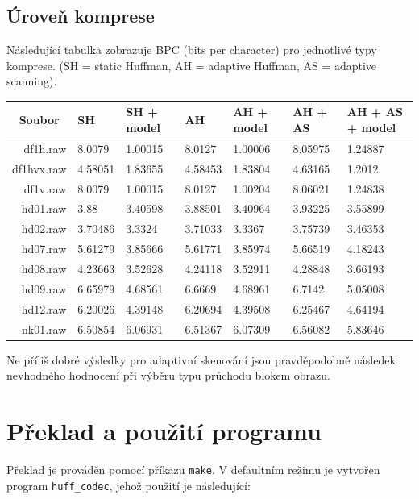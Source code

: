 \documentclass[12pt,a4paper,titlepage,final]{report}
\begin{document}
\subsection{Úroveň komprese}
Následující tabulka zobrazuje BPC (bits per character) pro jednotlivé typy komprese. (SH = static Huffman, AH = adaptive Huffman, AS = adaptive scanning).
\begin{table}[H]
\begin{tabular}{|r|l|l|l|l|l|l|}
\hline
\multicolumn{1}{|c|}{Soubor} & SH      & SH + model & AH      & AH + model & AH + AS & AH + AS + model \\ \hline
df1h.raw                     & 8.0079  & 1.00015    & 8.0127  & 1.00006    & 8.05975 & 1.24887         \\ \hline
df1hvx.raw                   & 4.58051 & 1.83655    & 4.58453 & 1.83804    & 4.63165 & 1.2012         \\ \hline
df1v.raw                     & 8.0079  & 1.00015    & 8.0127  & 1.00204    & 8.06021 & 1.24838         \\ \hline
hd01.raw                     & 3.88    & 3.40598    & 3.88501 & 3.40964    & 3.93225 & 3.55899          \\ \hline
hd02.raw                     & 3.70486 & 3.3324     & 3.71033 & 3.3367     & 3.75739 & 3.46353         \\ \hline
hd07.raw                     & 5.61279 & 3.85666    & 5.61771 & 3.85974    & 5.66519 & 4.18243         \\ \hline
hd08.raw                     & 4.23663 & 3.52628    & 4.24118 & 3.52911    & 4.28848 & 3.66193         \\ \hline
hd09.raw                     & 6.65979 & 4.68561    & 6.6669  & 4.68961    & 6.7142  & 5.05008         \\ \hline
hd12.raw                     & 6.20026 & 4.39148    & 6.20694 & 4.39508    & 6.25467 & 4.64194         \\ \hline
nk01.raw                     & 6.50854 & 6.06931    & 6.51367 & 6.07309    & 6.56082 & 5.83646         \\ \hline
\end{tabular}
\end{table}

Ne příliš dobré výsledky pro adaptivní skenování jsou pravděpodobně následek nevhodného hodnocení při výběru typu průchodu blokem obrazu.


\section{Překlad a použití programu}
Překlad je prováděn pomocí příkazu \texttt{make}. V defaultním režimu je vytvořen program \texttt{huff\_codec}, jehož použití je následující:
\end{document}

